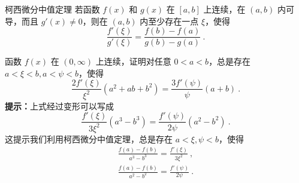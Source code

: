 \begin{theorem}{柯西微分中值定理}\label{the_MeanTh_3}
若函数 $f(x)$ 和 $g(x)$ 在 $[a,b]$ 上连续，在 $(a,b)$ 内可导，而且 $g'(x)\neq 0$，则在 $(a,b)$ 内至少存在一点 $\xi$，使得
\begin{equation}\label{eq_MeanTh_1}{}
\frac{f'(\xi)}{g'(\xi)}=\frac{f(b)-f(a)}{g(b)-g(a)}~.
\end{equation}
\end{theorem}
\begin{exercise}{}
函数 $f(x)$ 在 $(0,\infty)$ 上连续，证明对任意 $0 < a < b$，总是存在 $a < \xi < b, a< \psi <b$，使得
\begin{equation}
\frac{2f'(\xi)}{\xi^2}(a^2+ab+b^2)=\frac{3f'(\psi)}{\psi}(a+b)~.
\end{equation}
\textbf{提示：}上式经过变形可以写成
\begin{equation}
\frac{f'(\xi)}{3\xi^2}(a^3-b^3)=\frac{f'(\psi)}{2\psi}(a^2-b^2)~.
\end{equation}
这提示我们利用柯西微分中值定理，总是存在 $a<\xi,\psi<b$，使得
\begin{equation}
\begin{aligned}
\frac{f(a)-f(b)}{a^3-b^3}=\frac{f'(\xi)}{3\xi^2}~,\\
\frac{f(a)-f(b)}{a^2-b^2}=\frac{f'(\psi)}{2\psi}~.
\end{aligned}
\end{equation}
\end{exercise}